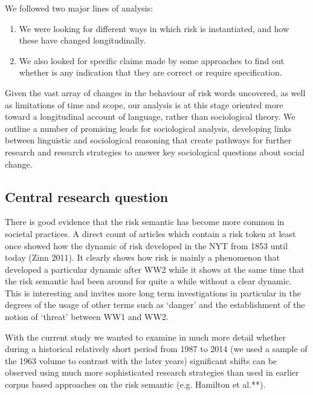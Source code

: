 We followed two major lines of analysis:

\begin{enumerate}
\item We were looking for different ways in which risk is instantiated, and how these have changed longitudinally.
\item We also looked for specific claims made by some approaches to find out whether is any indication that they are correct or require specification. 
\end{enumerate}
%
Given the vast array of changes in the behaviour of risk words uncovered, as well as limitations of time and scope, our analysis is at this stage oriented more toward a longitudinal account of language, rather than sociological theory. We outline a number of promising leads for sociological analysis, developing links between linguistic and sociological reasoning that create pathways for further research and research strategies to answer key sociological questions about social change.

\subsection{Central research question}

There is good evidence that the risk semantic has become more common in societal practices. A direct count of articles which contain a risk token at least once showed how the dynamic of risk developed in the NYT from 1853 until today (Zinn 2011). It clearly shows how risk is mainly a phenomenon that developed a particular dynamic after WW2 while it shows at the same time that the risk semantic had been around for quite a while without a clear dynamic. This is interesting and invites more long term investigations in particular in the degrees of the usage of other terms such as `danger' and the establishment of the notion of `threat' between WW1 and WW2.

With the current study we wanted to examine in much more detail whether during a historical relatively short period from 1987 to 2014 (we used a sample of the 1963 volume to contrast with the later years) significant shifts can be observed using much more sophisticated research strategies than used in earlier corpus based approaches on the risk semantic (e.g. Hamilton et al.**).


